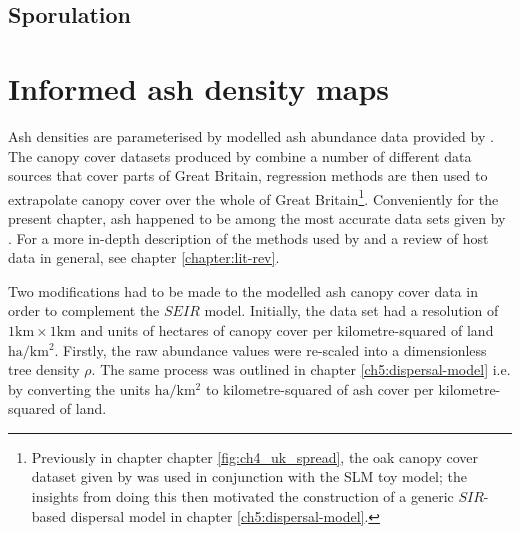 


\subsection{Sporulation}




\section{Informed ash density maps}

Ash densities are parameterised by modelled ash abundance data provided by \cite{hill.data}. The canopy cover datasets produced by \cite{hill.data} combine a number of different data sources that cover parts of Great Britain, regression methods are then used to extrapolate canopy cover over the whole of Great Britain\footnote{Previously in chapter chapter \ref{fig:ch4_uk_spread}, the oak canopy cover dataset given by \cite{hill.data} was used in conjunction with the SLM toy model; the insights from doing this then motivated the construction of a generic $SIR$-based dispersal model in chapter \ref{ch5:dispersal-model}.}. Conveniently for the present chapter, ash happened to be among the most accurate data sets given by \cite{hill.data}. For a more in-depth description of the methods used by \cite{hill.data} and a review of host data in general, see chapter \ref{chapter:lit-rev}.

 Two modifications had to be made to the modelled ash canopy cover data in order to complement the $SEIR$ model. Initially, the data set had a resolution of $\mathrm{1km}\times \mathrm{1km}$ and units of hectares of canopy cover per kilometre-squared of land $\mathrm{ha/km^2}$. Firstly, the raw abundance values were re-scaled into a dimensionless tree density $\rho$. The same process was outlined in chapter \ref{ch5:dispersal-model} i.e. by converting the units $\mathrm{ha/km^2}$ to kilometre-squared of ash cover per kilometre-squared of land. 
 
